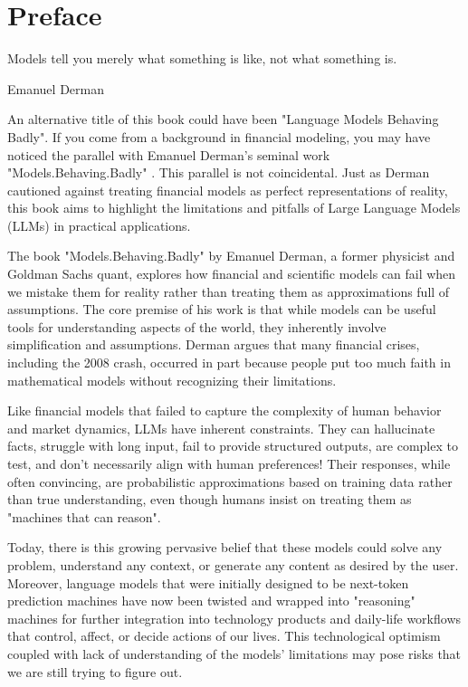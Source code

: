 \hypertarget{preface}{%
\chapter*{Preface}\label{preface}}

\epigraph{Models tell you merely what something is like, not what something is.}{Emanuel Derman}

An alternative title of this book could have been "Language Models Behaving Badly". If you come from a background in financial modeling, you may have noticed the parallel with Emanuel Derman's seminal work "Models.Behaving.Badly" \cite{derman2011models}. This parallel is not coincidental. Just as Derman cautioned against treating financial models as perfect representations of reality, this book aims to highlight the limitations and pitfalls of Large Language Models (LLMs) in practical applications.

The book "Models.Behaving.Badly" by Emanuel Derman, a former physicist and Goldman Sachs quant, explores how financial and scientific models can fail when we mistake them for reality rather than treating them as approximations full of assumptions.
The core premise of his work is that while models can be useful tools for understanding aspects of the world, they inherently involve simplification and assumptions. Derman argues that many financial crises, including the 2008 crash, occurred in part because people put too much faith in mathematical models without recognizing their limitations.

Like financial models that failed to capture the complexity of human behavior and market dynamics, LLMs have inherent constraints. They can hallucinate facts, struggle with long input, fail to provide structured outputs, are complex to test, and don't necessarily align with human preferences! Their responses, while often convincing, are probabilistic approximations based on training data rather than true understanding, even though humans insist on treating them as "machines that can reason".

Today, there is this growing pervasive belief that these models could solve any problem, understand any context, or generate any content as desired by the user. Moreover, language models that were initially designed to be next-token prediction machines have now been twisted and wrapped into "reasoning" machines for further integration into technology products and daily-life workflows that control, affect, or decide actions of our lives. This technological optimism coupled with lack of understanding of the models' limitations may pose risks that we are still trying to figure out.

